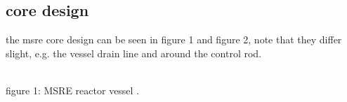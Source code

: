 \documentclass{article}
\begin{document}
\begin{preview}
\section{core design}
the msre core design can be seen in figure 1 and figure 2, note that they differ slight, e.g. the vessel drain line and around the control rod.
\begin{center}
  \\
  figure 1: MSRE reactor vessel \parencite[figure 1]{ornl-tm-3229}.
\end{center}
\begin{center}

\end{center}
\end{preview}
\end{document}
